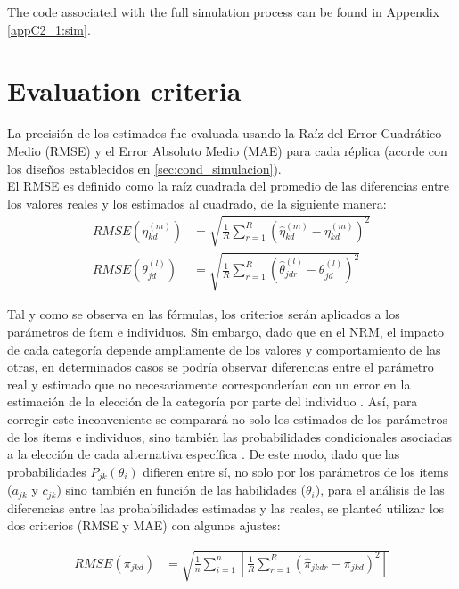 The code associated with the full simulation process can be found in Appendix \ref{appC2_1:sim}.


\section{Evaluation criteria}

La precisión de los estimados fue evaluada usando la Raíz del Error Cuadrático Medio (RMSE) y el Error Absoluto Medio (MAE) para cada réplica (acorde con los diseños establecidos en \ref{sec:cond_simulacion}). \\

El RMSE es definido como la raíz cuadrada del promedio de las diferencias entre los valores reales y los estimados al cuadrado, de la siguiente manera:
\begin{align}
	RMSE \left( \eta^{(m)}_{kd} \right) &=\sqrt{\frac{1}{R} \sum_{r=1}^{R} (\hat{\eta}^{(m)}_{kd} - \eta^{(m)}_{kd} )^2} \\
	RMSE \left( \theta^{(l)}_{jd} \right) &=\sqrt{\frac{1}{R} \sum_{r=1}^{R} (\hat{\theta}^{(l)}_{jdr}-\theta^{(l)}_{jd})^2}
\end{align}

Tal y como se observa en las fórmulas, los criterios serán aplicados a los parámetros de ítem e individuos. Sin embargo, dado que en el NRM, el impacto de cada categoría depende ampliamente de los valores y comportamiento de las otras, en determinados casos se podría observar diferencias entre el parámetro real y estimado que no necesariamente corresponderían con un error en la estimación de la elección de la categoría por parte del individuo \citep{Wollack2002}. Así, para corregir este inconveniente se comparará no solo los estimados de los parámetros de los ítems e individuos, sino también las probabilidades condicionales asociadas a la elección de cada alternativa específica \cite{Yen_1987, Wollack_2002}. De este modo, dado que las probabilidades $P_{jk}(\theta_{i})$ difieren entre sí, no solo por los parámetros de los ítems ($a_{jk}$ y $c_{jk}$) sino también en función de las habilidades ($\theta_i$), para el análisis de las diferencias entre las probabilidades estimadas y las reales, se planteó utilizar los dos criterios (RMSE y MAE) con algunos ajustes:

\begin{align}
	RMSE \left( \pi_{jkd} \right) &=\sqrt{ \frac{1}{n} \sum_{i=1}^{n} \left[ \frac{1}{R} \sum_{r=1}^{R} (\hat{\pi}_{jkdr} - \pi_{jkd})^2 \right]} \\
\end{align}

